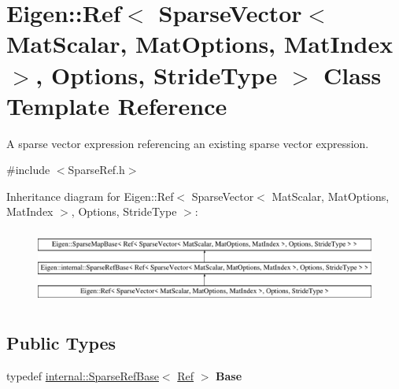 \hypertarget{class_eigen_1_1_ref_3_01_sparse_vector_3_01_mat_scalar_00_01_mat_options_00_01_mat_index_01_4_00357b3c2eca55b7ce618d0a2b2447510f}{}\section{Eigen\+::Ref$<$ Sparse\+Vector$<$ Mat\+Scalar, Mat\+Options, Mat\+Index $>$, Options, Stride\+Type $>$ Class Template Reference}
\label{class_eigen_1_1_ref_3_01_sparse_vector_3_01_mat_scalar_00_01_mat_options_00_01_mat_index_01_4_00357b3c2eca55b7ce618d0a2b2447510f}


A sparse vector expression referencing an existing sparse vector expression.  




{\ttfamily \#include $<$Sparse\+Ref.\+h$>$}

Inheritance diagram for Eigen\+::Ref$<$ Sparse\+Vector$<$ Mat\+Scalar, Mat\+Options, Mat\+Index $>$, Options, Stride\+Type $>$\+:\begin{figure}[H]
\begin{center}
\leavevmode
\includegraphics[height=2.488889cm]{class_eigen_1_1_ref_3_01_sparse_vector_3_01_mat_scalar_00_01_mat_options_00_01_mat_index_01_4_00357b3c2eca55b7ce618d0a2b2447510f}
\end{center}
\end{figure}
\subsection*{Public Types}
\begin{DoxyCompactItemize}
\item 
\mbox{\label{class_eigen_1_1_ref_3_01_sparse_vector_3_01_mat_scalar_00_01_mat_options_00_01_mat_index_01_4_00357b3c2eca55b7ce618d0a2b2447510f_a27f39a346d1650d7e3522bc2b39d8e1c}} 
typedef \mbox{\hyperlink{class_eigen_1_1internal_1_1_sparse_ref_base}{internal\+::\+Sparse\+Ref\+Base}}$<$ \mbox{\hyperlink{class_eigen_1_1_ref}{Ref}} $>$ {\bfseries Base}
\end{DoxyCompactItemize}
